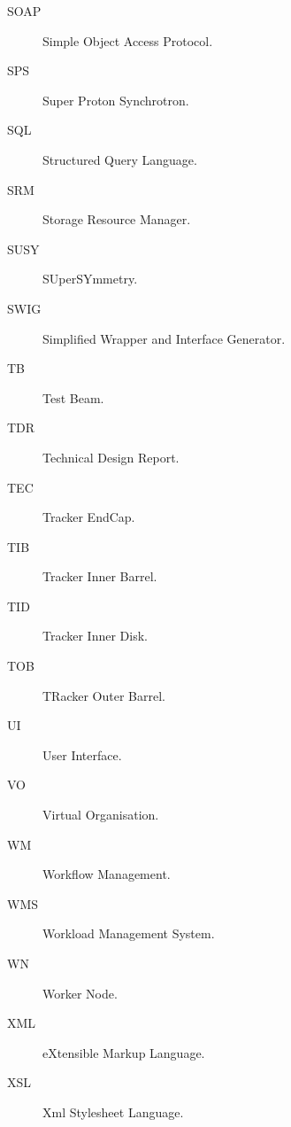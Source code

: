 \begin{description}
\item[SOAP] Simple Object Access Protocol.
\item[SPS] Super Proton Synchrotron.
\item[SQL] Structured Query Language.
\item[SRM] Storage Resource Manager.
\item[SUSY] SUperSYmmetry.
\item[SWIG] Simplified Wrapper and Interface Generator.
\item[TB] Test Beam. 
\item[TDR] Technical Design Report. 
\item[TEC] Tracker EndCap.
\item[TIB] Tracker Inner Barrel.
\item[TID] Tracker Inner Disk.
\item[TOB] TRacker Outer Barrel.
\item[UI] User Interface.
\item[VO] Virtual Organisation.
\item[WM] Workflow Management.
\item[WMS] Workload Management System.
\item[WN] Worker Node.
\item[XML] eXtensible Markup Language.
\item[XSL] Xml Stylesheet Language.

\end{description}
